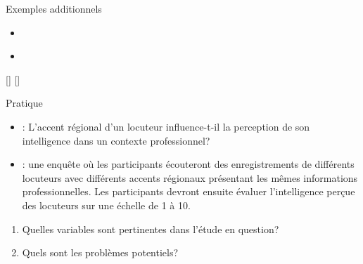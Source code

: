 \documentclass[xcolor=dvipsnames, mathserif, 10pt, aspectratio=169, handout]{beamer}
\begin{document}

\begin{frame}{Exemples additionnels}{}
	
	
	\begin{itemize}
	\item[] {\textbf{}}
	\item[]
	\end{itemize}
	\begin{center}
{\faVolumeUp} [] \hspace{3em} {\faVolumeUp} []
	\end{center}

	
\end{frame}





\begin{frame}{Pratique}
\begin{itemize}
	\item {} : L'accent régional d'un locuteur influence-t-il la perception de son intelligence dans un contexte professionnel?

 \item {} : une enquête où les participants écouteront des enregistrements de différents locuteurs avec différents accents régionaux présentant les mêmes informations professionnelles. Les participants devront ensuite évaluer l'intelligence perçue des locuteurs sur une échelle de 1 à 10.
\end{itemize}


\begin{important}
	\begin{enumerate}
		\item Quelles variables sont pertinentes dans l'étude en question?
		\item Quels sont les problèmes potentiels?
	\end{enumerate}
\end{important}

	
\end{frame}



\end{document}
